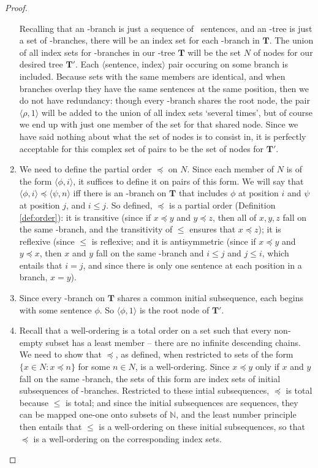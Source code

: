 \begin{theorem}
\begin{proof}
\begin{enumerate}
			Recalling that an \lone-branch is just a sequence of \lone\ sentences, and an \lone-tree is just a set of \lone-branches, there will be an index set for each \lone-branch in $\mathbf{T}$. The union of all index sets for \lone-branches in our \lone-tree $\mathbf{T}$ will be the set $N$ of nodes for our desired tree $\mathbf{T}'$. Each $\langle$sentence, index$\rangle$ pair occuring on some branch is included. Because sets with the same members are identical, and when branches overlap they have the same sentences at the same position, then we do not have redundancy: though every \lone-branch shares the root node, the pair $\langle \rho,1\rangle$ will be added to the union of all index sets `several times', but of course we end up with just one member of the set for that shared node. Since we have said nothing about what the set of nodes is to consist in, it is perfectly acceptable for this complex set of pairs to be the set of nodes for $\mathbf{T}'$.
			\item We need to define the partial order $\preceq$ on $N$. Since each member of $N$ is of the form $\langle \phi,i\rangle$, it suffices to define it on pairs of this form. We will say that $\langle \phi,i\rangle \preceq \langle \psi,n\rangle$ iff there is an \lone-branch on $\mathbf{T}$ that includes $\phi$ at position $i$ and $\psi$ at position $j$, and $i≤j$. So defined, $\preceq$ is a partial order (Definition \ref{def:order}): it is transitive (since if $x\preceq y$ and $y\preceq z$, then all of $x,y,z$ fall on the same \lone-branch, and the transitivity of $≤$ ensures that $x\preceq z$); it is reflexive (since $≤$ is reflexive; and it is antisymmetric (since if $x\preceq y$ and $y\preceq x$, then $x$ and $y$ fall on the same \lone-branch and $i≤j$ and $j≤i$, which entails that $i=j$, and since there is only one sentence at each position in a branch, $x=y$).
			\item Since every \lone-branch on $\mathbf{T}$ shares a common initial subsequence, each begins with some sentence $\phi$. So $\langle \phi,1\rangle$ is the root node of $\mathbf{T}'$.
			\item Recall that a well-ordering is a total order on a set such that every non-empty subset has a least member – there are no infinite descending chains. We need to show that $\preceq$, as defined, when restricted to sets of the form $\{x \in N: x \preceq n\}$ for some $n\in N$, is a well-ordering. Since $x\preceq y$ only if $x$ and $y$ fall on the same \lone-branch, the sets of this form are index sets of initial subsequences of \lone-branches. Restricted to these intial subsequences, $\preceq$ is total because $≤$ is total; and since the initial subsequences are sequences, they can be mapped one-one onto subsets of $\mathbb{N}$, and the least number principle then entails that $≤$ is a well-ordering on these initial subsequences, so that $\preceq$ is a well-ordering on the corresponding index sets.

\end{enumerate}
\end{proof}
\end{theorem}
